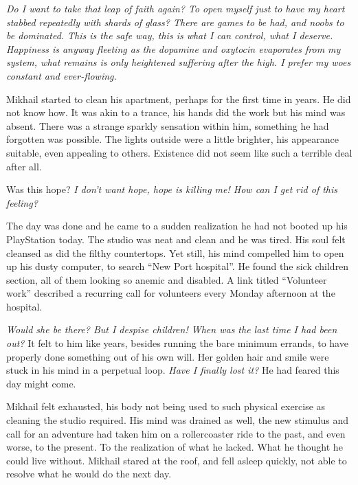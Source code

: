 \textit{Do I want to take that leap of faith again? To open myself just to have my heart stabbed repeatedly with shards of glass? There are games to be had, and noobs to be dominated. This is the safe way, this is what I can control, what I deserve. Happiness is anyway fleeting as the dopamine and oxytocin evaporates from my system, what remains is only heightened suffering after the high. I prefer my woes constant and ever-flowing.}

Mikhail started to clean his apartment, perhaps for the first time in years. He did not know how. It was akin to a trance, his hands did the work but his mind was absent. There was a strange sparkly sensation within him, something he had forgotten was possible. The lights outside were a little brighter, his appearance suitable, even appealing to others. Existence did not seem like such a terrible deal after all.

Was this hope? \textit{I don’t want hope, hope is killing me! How can I get rid of this feeling?}

The day was done and he came to a sudden realization he had not booted up his PlayStation today. The studio was neat and clean and he was tired. His soul felt cleansed as did the filthy countertops. Yet still, his mind compelled him to open up his dusty computer, to search “New Port hospital”. He found the sick children section, all of them looking so anemic and disabled. A link titled “Volunteer work” described a recurring call for volunteers every Monday afternoon at the hospital.

\textit{Would she be there? But I despise children! When was the last time I had been out?} It felt to him like years, besides running the bare minimum errands, to have properly done something out of his own will. Her golden hair and smile were stuck in his mind in a perpetual loop. \textit{Have I finally lost it?} He had feared this day might come. 

Mikhail felt exhausted, his body not being used to such physical exercise as cleaning the studio required. His mind was drained as well, the new stimulus and call for an adventure had taken him on a rollercoaster ride to the past, and even worse, to the present. To the realization of what he lacked. What he thought he could live without. Mikhail stared at the roof, and fell asleep quickly, not able to resolve what he would do the next day.